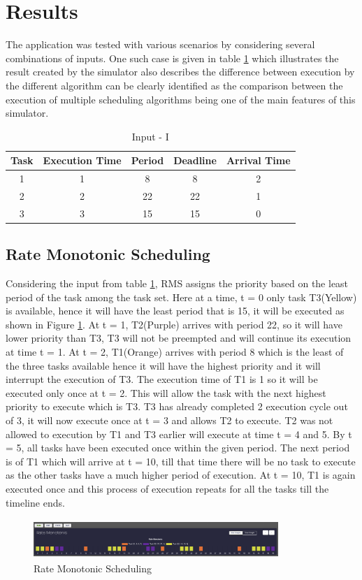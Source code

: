 \documentclass[12pt, conference]{IEEEtran}
\begin{document}
\section{Results}
 The application was tested with various scenarios by considering several combinations of inputs. One such case is given in table \ref{tab:input} which illustrates the result created by the simulator also describes the difference between execution by the different algorithm can be clearly identified as the comparison between the execution of multiple scheduling algorithms being one of the main features of this simulator.
 
\begin{table}[]
    \centering
    \caption{Input - I}
    \label{tab:input}
    \begin{tabular}{|c|c|c|c|c|}
    \hline
        Task & Execution Time & Period & Deadline & Arrival Time  \\
    \hline
         1 & 1 & 8 & 8 & 2 \\  
         \hline
         2 & 2 & 22 & 22 & 1 \\
         \hline
         3 & 3 & 15 & 15 & 0 \\
         \hline
    \end{tabular}
\end{table}


\subsection{Rate Monotonic Scheduling}
Considering the input from table \ref{tab:input}, RMS assigns the priority based on the least period of the task among the task set. Here at a time, t = 0 only task T3(Yellow) is available, hence it will have the least period that is 15, it will be executed as shown in Figure \ref{Output_RMS}. At t = 1, T2(Purple) arrives with period 22, so it will have lower priority than T3, T3 will not be preempted and will continue its execution at time t = 1.  At t = 2, T1(Orange) arrives with period 8 which is the least of the three tasks available hence it will have the highest priority and it will interrupt the execution of T3. The execution time of T1 is 1 so it will be executed only once at t = 2. This will allow the task with the next highest priority to execute which is T3. T3 has already completed 2 execution cycle out of 3, it will now execute once at t = 3 and allows T2 to execute. T2 was not allowed to execution by T1 and T3 earlier will execute at time t = 4 and 5. By t = 5, all tasks have been executed once within the given period. The next period is of T1 which will arrive at t = 10, till that time there will be no task to execute as the other tasks have a much higher period of execution. At t = 10, T1 is again executed once and this process of execution repeats for all the tasks till the timeline ends.
\begin{figure}
\centerline{\includegraphics[width=9.25cm, height=1.5cm]{Output_RMS.png}}
\caption{Rate Monotonic Scheduling}
\label{Output_RMS}
\end{figure} 
\end{document}
